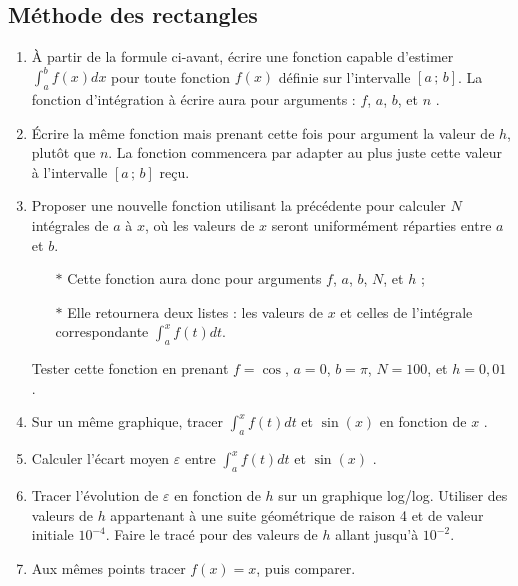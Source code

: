 \subsection{Méthode des rectangles}
\begin{enumerate}
\item À  partir de  la formule ci-avant,  écrire une  fonction capable
  d'estimer $\int_a^b  f(x)dx$ pour toute fonction  $f(x)$ définie sur
  l'intervalle $[a\,;\,b]$.  La fonction  d'intégration
  à   écrire  aura   pour  arguments   :   $f$,  $a$,   $b$,  et   $n$
  .
\item Écrire la même fonction mais prenant cette fois pour argument la
  valeur de  $h$, plutôt que $n$.  La  fonction commencera par  adapter au  plus juste
  cette valeur à l'intervalle $[a\,;\,b]$ reçu.
\item Proposer  une nouvelle  fonction utilisant la précédente
  pour calculer  $N$ intégrales de  $a$ à $x$,  où les valeurs  de $x$
  seront  uniformément  réparties  entre  $a$ et  $b$.
  \begin{itemize}
  \item[$\ast$] Cette fonction aura donc  pour arguments $f$, $a$, $b$,
    $N$, et $h$ ;
  \item[$\ast$] Elle retournera deux listes :  les valeurs   de  $x$   et
    celles  de   l'intégrale  correspondante $\int_a^xf(t)dt$.
  \end{itemize}
  Tester cette fonction en prenant $f=\cos$, $a=0$, $b=\pi$, $N=100$, et
  $h=0,01$
  .\\
\item  Sur un même graphique, tracer $\int_a^xf(t)dt$ et $\sin(x)$ en fonction de $x$
  .
\item  Calculer  l'écart  moyen $\varepsilon$ entre  $\int_a^xf(t)dt$  et  $\sin(x)$
  .
\item  Tracer l'évolution  de  $\varepsilon$  en fonction  de  $h$ sur  un
  graphique   log/log. Utiliser  des valeurs  de  $h$  appartenant à  une  suite
  géométrique de  raison 4 et  de valeur initiale $10^{-4}$.  Faire le
  tracé pour des valeurs de $h$ allant jusqu'à $10^{-2}$.
\item Aux   mêmes  points   tracer  $f(x)=x$,   puis  comparer.


\end{enumerate}

